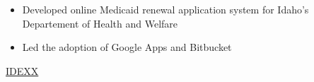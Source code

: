 \documentclass[10pt,a4paper]{article}
\begin{document}
{{{\begin{itemize}
      \item Developed online Medicaid renewal application system for Idaho's Departement of Health and Welfare
      \item Led the adoption of Google Apps and Bitbucket 
    \end{itemize}
    }
    \vspace{0.5em}
    {}
  }  
   
}



\headedsection
  {\href{https://www.idexx.com/en/}{IDEXX}}
\end{document}
